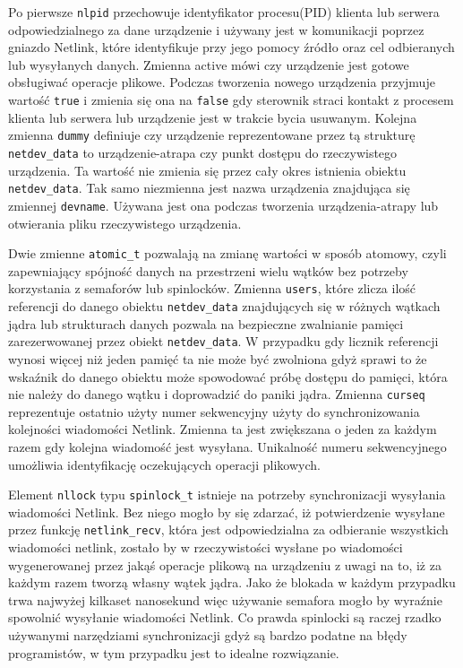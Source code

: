 Po pierwsze \texttt{nlpid} przechowuje identyfikator procesu(PID)
klienta lub serwera odpowiedzialnego za dane urządzenie i używany jest w
komunikacji poprzez gniazdo Netlink, które identyfikuje przy jego pomocy
źródło oraz cel odbieranych lub wysyłanych danych. Zmienna active mówi
czy urządzenie jest gotowe obsługiwać operacje plikowe. Podczas
tworzenia nowego urządzenia przyjmuje wartość \texttt{true} i zmienia
się ona na \texttt{false} gdy sterownik straci kontakt z procesem
klienta lub serwera lub urządzenie jest w trakcie bycia usuwanym.
Kolejna zmienna \texttt{dummy} definiuje czy urządzenie reprezentowane
przez tą strukturę \texttt{netdev\_data} to urządzenie-atrapa czy punkt
dostępu do rzeczywistego urządzenia. Ta wartość nie zmienia się przez
cały okres istnienia obiektu \texttt{netdev\_data}. Tak samo niezmienna
jest nazwa urządzenia znajdująca się zmiennej \texttt{devname}. Używana
jest ona podczas tworzenia urządzenia-atrapy lub otwierania pliku
rzeczywistego urządzenia.

Dwie zmienne \texttt{atomic\_t} pozwalają na zmianę wartości w sposób
atomowy, czyli zapewniający spójność danych na przestrzeni wielu wątków
bez potrzeby korzystania z semaforów lub spinlocków. Zmienna
\texttt{users}, które zlicza ilość referencji do danego obiektu
\texttt{netdev\_data} znajdujących się w różnych wątkach jądra lub
strukturach danych pozwala na bezpieczne zwalnianie pamięci
zarezerwowanej przez obiekt \texttt{netdev\_data}. W przypadku gdy
licznik referencji wynosi więcej niż jeden pamięć ta nie może być
zwolniona gdyż sprawi to że wskaźnik do danego obiektu może spowodować
próbę dostępu do pamięci, która nie należy do danego wątku i doprowadzić
do paniki jądra. Zmienna \texttt{curseq} reprezentuje ostatnio użyty
numer sekwencyjny użyty do synchronizowania kolejności wiadomości
Netlink. Zmienna ta jest zwiększana o jeden za każdym razem gdy kolejna
wiadomość jest wysyłana. Unikalność numeru sekwencyjnego umożliwia
identyfikację oczekujących operacji plikowych.

Element \texttt{nllock} typu \texttt{spinlock\_t} istnieje na potrzeby
synchronizacji wysyłania wiadomości Netlink. Bez niego mogło by się
zdarzać, iż potwierdzenie wysyłane przez funkcję \texttt{netlink\_recv},
która jest odpowiedzialna za odbieranie wszystkich wiadomości netlink,
zostało by w rzeczywistości wysłane po wiadomości wygenerowanej przez
jakąś operacje plikową na urządzeniu z uwagi na to, iż za każdym razem
tworzą własny wątek jądra. Jako że blokada w każdym przypadku trwa
najwyżej kilkaset nanosekund więc używanie semafora mogło by wyraźnie
spowolnić wysyłanie wiadomości Netlink. Co prawda spinlocki są raczej
rzadko używanymi narzędziami synchronizacji gdyż są bardzo podatne na
błędy programistów, w tym przypadku jest to idealne rozwiązanie.

